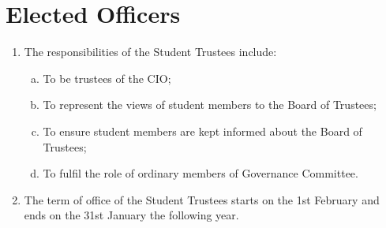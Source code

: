 \documentclass[12pt]{article}
\begin{document}
\section{Elected Officers}
\begin{enumerate}
    \subsection{Student Trustees}
    \item The responsibilities of the Student Trustees include:
    \begin{enumerate}[(a)]
        \item To be trustees of the CIO;
        \item To represent the views of student members to the Board of Trustees;
        \item To ensure student members are kept informed about the Board of Trustees;
        \item To fulfil the role of ordinary members of Governance Committee.
    \end{enumerate}
    \item The term of office of the Student Trustees starts on the 1st February and ends on the 31st January the following year.
\end{enumerate}
\end{document}
